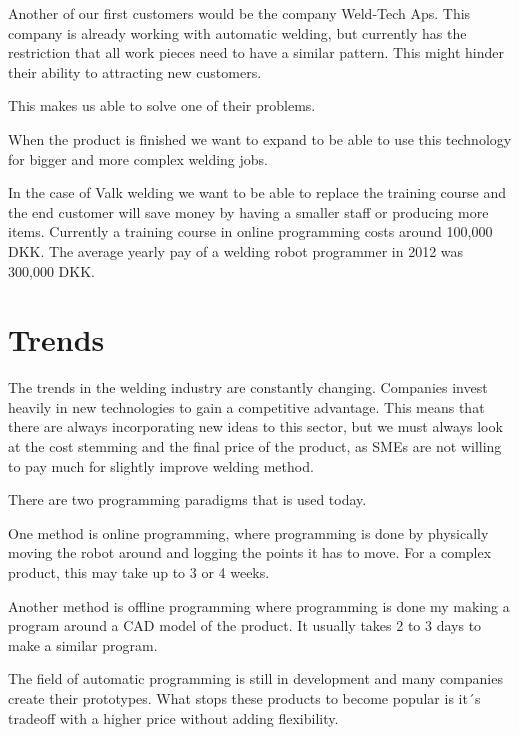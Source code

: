 Another of our first customers would be the company Weld-Tech Aps. 
This company is already working with automatic welding, but currently has the restriction that all work pieces need to have a similar pattern. 
This might hinder their ability to attracting new customers.

This makes us able to solve one of their problems. 

When the product is finished we want to expand to be able to use this technology for bigger and more complex welding jobs.

In the case of Valk welding we want to be able to replace the training course and the end customer will save money by having a smaller staff or producing more items. 
Currently a training course in online programming costs around 100,000 DKK. 
The average yearly pay of a welding robot programmer in 2012 was 300,000 DKK. 

\section{Trends}
The trends in the welding industry are constantly changing. 
Companies invest heavily in new technologies to gain a competitive advantage. 
This means that there are always incorporating new ideas to this sector, but we must always look at the cost stemming and the final price of the product, as SMEs are not willing to pay much for slightly improve welding method.

There are two programming paradigms that is used today.

One method is online programming, where programming is done by physically moving the robot around and logging the points it has to move. For a complex product, this may take up to 3 or 4 weeks.

Another method is offline programming where programming is done my making a program around a CAD model of the product.
It usually takes 2 to 3 days to make a similar program.

The field of automatic programming is still in development and many companies create their prototypes. 
What stops these products to become popular is it´s tradeoff with a higher price without adding flexibility.